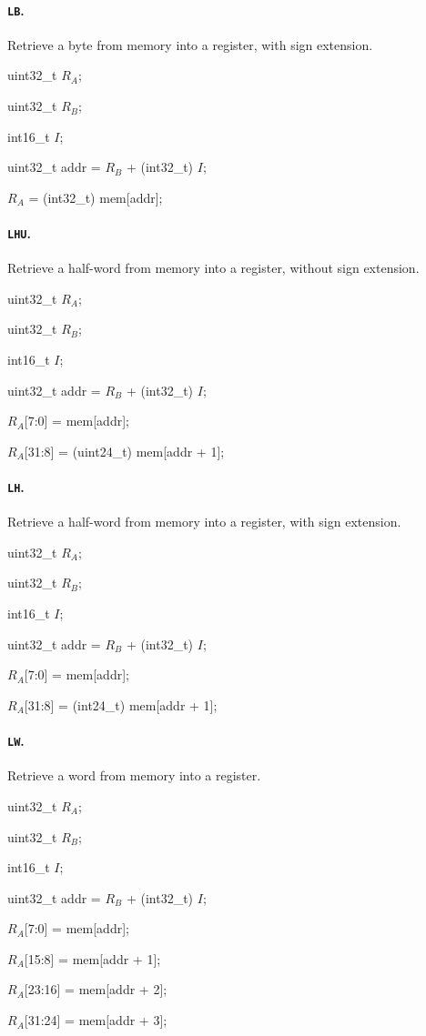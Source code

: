 \documentclass[12pt,english,twoside]{report}
\def\code{\texttt}
\def\subsubsubsection{\paragraph}
\newenvironment{codeblock}
{\begin{list}{}{
\setlength{\rightmargin}{\leftmargin}
\setlength{\listparindent}{0pt}%
\raggedright
\setlength{\itemsep}{0pt}
\setlength{\parsep}{0pt}
\normalfont\ttfamily}%
 \item[]}
{\end{list}}
\begin{document}
\subsubsubsection{\label{sec:Ins_LB}\code{LB}.}
Retrieve a byte from memory into a register, with sign extension.

\begin{codeblock}
  uint32\_t $R_A$;
  
  uint32\_t $R_B$;

  int16\_t $I$;

  uint32\_t addr = $R_B$ + (int32\_t) $I$;

  $R_A$ = (int32\_t) mem[addr];
\end{codeblock}

\subsubsubsection{\label{sec:Ins_LHU}\code{LHU}.}
Retrieve a half-word from memory into a register, without sign extension.

\begin{codeblock}
  uint32\_t $R_A$;
  
  uint32\_t $R_B$;

  int16\_t $I$;

  uint32\_t addr = $R_B$ + (int32\_t) $I$;

  $R_A$[7:0] = mem[addr];

  $R_A$[31:8] = (uint24\_t) mem[addr + 1];
\end{codeblock}

\subsubsubsection{\label{sec:Ins_LH}\code{LH}.}
Retrieve a half-word from memory into a register, with sign extension.

\begin{codeblock}
  uint32\_t $R_A$;
  
  uint32\_t $R_B$;

  int16\_t $I$;

  uint32\_t addr = $R_B$ + (int32\_t) $I$;

  $R_A$[7:0] = mem[addr];

  $R_A$[31:8] = (int24\_t) mem[addr + 1];
\end{codeblock}

\subsubsubsection{\label{sec:Ins_LW}\code{LW}.}
Retrieve a word from memory into a register.

\begin{codeblock}
  uint32\_t $R_A$;
  
  uint32\_t $R_B$;

  int16\_t $I$;

  uint32\_t addr = $R_B$ + (int32\_t) $I$;

  $R_A$[7:0] = mem[addr];

  $R_A$[15:8] = mem[addr + 1];

  $R_A$[23:16] = mem[addr + 2];

  $R_A$[31:24] = mem[addr + 3];
\end{codeblock}
\end{document}
